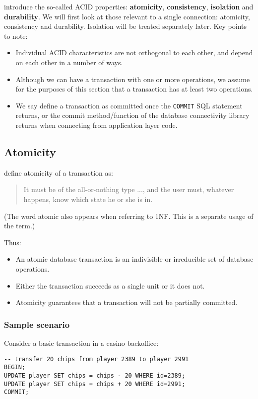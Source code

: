 \documentclass[slides]{pgnotes}
\begin{document}
\citet{haerder:1983:principles} introduce the so-called ACID properties: \textbf{atomicity}, \textbf{consistency}, \textbf{isolation} and \textbf{durability}.
We will first look at those relevant to a single connection: atomicity, consistency and durability.
Isolation will be treated separately later. Key points to note:
\begin{itemize}
\item Individual ACID characteristics are not orthogonal to each other, and depend on each other in a number of ways.
\item Although we can have a transaction with one or more operations, we assume for the purposes of this section that a transaction has at least two operations. 
\item We say define a transaction as committed once the  \texttt{COMMIT} SQL statement returns, or the commit method/function of the database connectivity library returns when connecting from application layer code.
\end{itemize}

\subsection{Atomicity}
\label{sec:atomicity}

\citet{haerder:1983:principles} define atomicity of a transaction as:
\begin{quotation}
  It must be of the all-or-nothing type ..., and the user must, whatever happens, know which state he or she is in.
\end{quotation}
(The word atomic also appears when referring to 1NF. This is a separate usage of the term.)

Thus:
\begin{itemize}
\item An atomic database transaction is an indivisible or irreducible set of database operations.
\item Either the transaction succeeds as a single unit or it does not.
\item Atomicity guarantees that a transaction will not be partially committed.
\end{itemize}

\subsubsection{Sample scenario}

Consider a basic transaction in a casino backoffice: 
\begin{verbatim}
-- transfer 20 chips from player 2389 to player 2991
BEGIN; 
UPDATE player SET chips = chips - 20 WHERE id=2389;
UPDATE player SET chips = chips + 20 WHERE id=2991;
COMMIT;
\end{verbatim}
\end{document}
